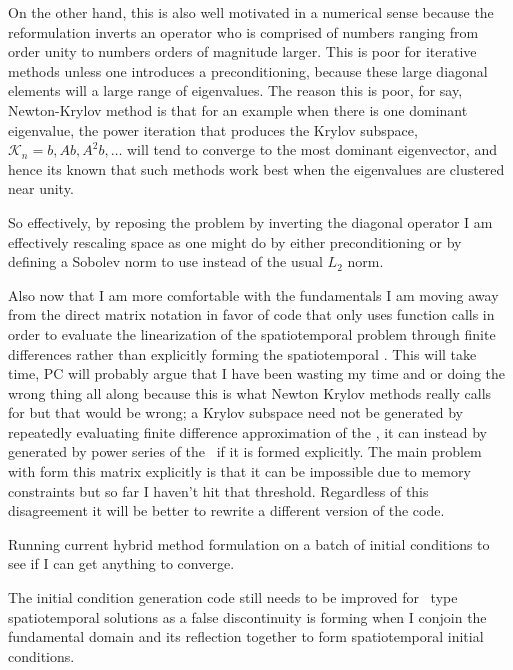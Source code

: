 \begin{description}
{\begin{description}
On the other hand, this is also well motivated in a numerical sense because the reformulation
inverts an operator who is comprised of numbers ranging from order unity to numbers orders of magnitude
larger. This is poor for iterative methods unless one introduces a preconditioning, because these large
diagonal elements will a large range of eigenvalues. The reason this is poor, for say, Newton-Krylov method
is that for an example when there is one dominant eigenvalue, the power iteration that produces
the Krylov subspace, $\mathcal{K}_n = {b, Ab, A^2 b, \dots}$ will tend to converge to the most dominant
eigenvector, and hence its known that such methods work best when the eigenvalues are clustered near unity.

So effectively, by reposing the problem by inverting the diagonal operator I am effectively rescaling
space as one might do by either preconditioning or by defining a Sobolev norm to use instead of the
usual $L_2$ norm.


\item[misc]
Also now that I am more comfortable with the fundamentals I am moving away from the
direct matrix notation in favor of code that only uses function calls in order
to evaluate the linearization of the spatiotemporal problem through finite differences
rather than explicitly forming the spatiotemporal \jacobianM. This will take time,
PC will probably argue that I have been wasting my time and or doing the wrong thing all
along because this is what Newton Krylov methods really calls for but that would be wrong;
a Krylov subspace need not be generated by repeatedly evaluating finite difference approximation
of the \jacobianM, it can instead by generated by power series of the \jacobianM\ if
it is formed explicitly. The main problem with form this matrix explicitly is that it can
be impossible due to memory constraints but so far I haven't hit that threshold. Regardless
of this disagreement it will be better to rewrite a different version of the code.

\item[spatiotemp continueds]
Running current hybrid method formulation on a batch of initial conditions to see if I can get anything
to converge.

\item[known bugs]
The initial condition generation code still needs to be improved for \ppo\ type spatiotemporal
solutions as a false discontinuity is forming when I conjoin the fundamental domain and its
reflection together to form spatiotemporal initial conditions.


\end{description}}
\end{description}
